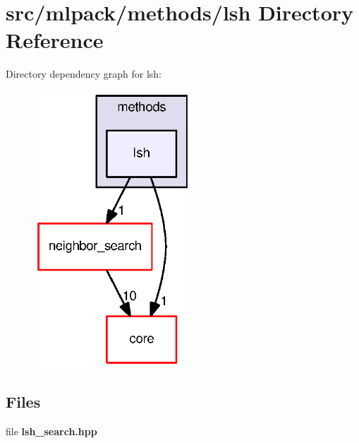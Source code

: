 \section{src/mlpack/methods/lsh Directory Reference}
\label{dir_390ed077ccb355ad25c9ee120c185888}
Directory dependency graph for lsh\+:
\nopagebreak
\begin{figure}[H]
\begin{center}
\leavevmode
\includegraphics[width=167pt]{dir_390ed077ccb355ad25c9ee120c185888_dep}
\end{center}
\end{figure}
\subsection*{Files}
\begin{DoxyCompactItemize}
\item 
file {\bf lsh\+\_\+search.\+hpp}
\end{DoxyCompactItemize}
